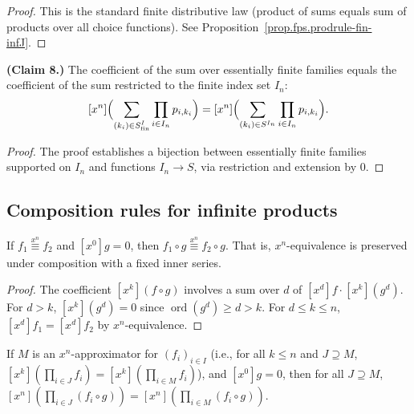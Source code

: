 \begin{proof}
\leanok
This is the standard finite distributive law
(product of sums equals sum of products over all choice functions).
See Proposition~\ref{prop.fps.prodrule-fin-infJ}.
\end{proof}

\begin{lemma}
\label{lem.fps.infprod.claim8}
\leanhelper
\leanok
\textbf{(Claim 8.)}
The coefficient of the sum over essentially finite families equals the coefficient
of the sum restricted to the finite index set $I_n$:
\[
[x^n]\Bigl(\sum_{\substack{(k_i) \in S^I_{\mathrm{fin}}}} \prod_{i \in I_n} p_{i,k_i}\Bigr)
= [x^n]\Bigl(\sum_{(k_i) \in S^{I_n}} \prod_{i \in I_n} p_{i,k_i}\Bigr).
\]
\end{lemma}

\begin{proof}
\leanok
The proof establishes a bijection between essentially finite families supported on $I_n$
and functions $I_n \to S$, via restriction and extension by $0$.
\end{proof}

\subsection{Composition rules for infinite products}

\begin{lemma}
\label{lem.fps.infprod.xnEquiv-comp}
\leanhelper
\leanok
If $f_1 \overset{x^n}{\equiv} f_2$ and $[x^0]g = 0$, then
$f_1 \circ g \overset{x^n}{\equiv} f_2 \circ g$.
That is, $x^n$-equivalence is preserved under composition with a fixed inner series.
\end{lemma}

\begin{proof}
\leanok
The coefficient $[x^k](f \circ g)$ involves a sum over $d$ of $[x^d]f \cdot [x^k](g^d)$.
For $d > k$, $[x^k](g^d) = 0$ since $\operatorname{ord}(g^d) \geq d > k$.
For $d \leq k \leq n$, $[x^d]f_1 = [x^d]f_2$ by $x^n$-equivalence.
\end{proof}

\begin{lemma}
\label{lem.fps.infprod.comp-approx}
\leanhelper
\leanok
If $M$ is an $x^n$-approximator for $(f_i)_{i \in I}$ (i.e., for all $k \leq n$
and $J \supseteq M$, $[x^k](\prod_{i \in J} f_i) = [x^k](\prod_{i \in M} f_i)$),
and $[x^0]g = 0$, then for all $J \supseteq M$,
$[x^n](\prod_{i \in J} (f_i \circ g)) = [x^n](\prod_{i \in M} (f_i \circ g))$.
\end{lemma}

